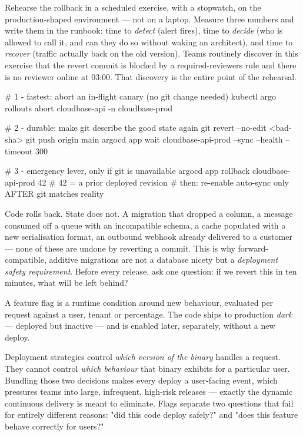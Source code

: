 \begin{drtip}
Rehearse the rollback in a scheduled exercise, with a stopwatch, on the production-shaped environment --- not on a laptop. Measure three numbers and write them in the runbook: time to \emph{detect} (alert fires), time to \emph{decide} (who is allowed to call it, and can they do so without waking an architect), and time to \emph{recover} (traffic actually back on the old version). Teams routinely discover in this exercise that the revert commit is blocked by a required-reviewers rule and there is no reviewer online at 03:00. That discovery is the entire point of the rehearsal.
\end{drtip}

\begin{bashbox}
# 1 - fastest: abort an in-flight canary (no git change needed)
kubectl argo rollouts abort cloudbase-api -n cloudbase-prod

# 2 - durable: make git describe the good state again
git revert --no-edit <bad-sha>
git push origin main
argocd app wait cloudbase-api-prod --sync --health --timeout 300

# 3 - emergency lever, only if git is unavailable
argocd app rollback cloudbase-api-prod 42   # 42 = a prior deployed revision
# then: re-enable auto-sync only AFTER git matches reality
\end{bashbox}

\begin{secwarn}
Code rolls back. State does not. A migration that dropped a column, a message consumed off a queue with an incompatible schema, a cache populated with a new serialisation format, an outbound webhook already delivered to a customer --- none of these are undone by reverting a commit. This is why forward-compatible, additive migrations are not a database nicety but a \emph{deployment safety requirement}. Before every release, ask one question: if we revert this in ten minutes, what will be left behind?
\end{secwarn}


 A feature flag is a runtime condition around new behaviour, evaluated per request against a user, tenant or percentage. The code ships to production \emph{dark} --- deployed but inactive --- and is enabled later, separately, without a new deploy.

 Deployment strategies control \emph{which version of the binary} handles a request. They cannot control \emph{which behaviour} that binary exhibits for a particular user. Bundling those two decisions makes every deploy a user-facing event, which pressures teams into large, infrequent, high-risk releases --- exactly the dynamic continuous delivery is meant to eliminate. Flags separate two questions that fail for entirely different reasons: "did this code deploy safely?" and "does this feature behave correctly for users?"

